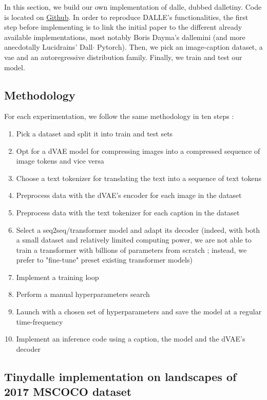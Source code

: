 \documentclass{article}
\begin{document}
\begin{multicols}{2}

In this section, we build our own implementation of \gls{dalle}, dubbed \gls{dalletiny}. Code is located on \href{https://github.com/cthiounn/dalle-tiny}{Github}. In order to reproduce DALLE's functionalities, the first step before implementing is to link the initial paper to the different already available implementations, most notably Boris Dayma's \gls{dallemini} (and more anecdotally Lucidrains' Dall$\cdot$ Pytorch). Then, we pick an image-caption dataset, a \gls{vae} and an autoregressive distribution family. Finally, we train and test our model.

\subsection{Methodology}

For each experimentation, we follow the same methodology in ten steps :

\begin{enumerate}
\item Pick a dataset and split it into train and test sets
    \item Opt for a dVAE model for compressing images into a compressed sequence of image tokens and vice versa
    \item Choose a text tokenizer for translating the text into a sequence of text tokens
    \item Preprocess data with the dVAE's encoder for each image in the dataset
    \item Preprocess data with the text tokenizer for each caption in the dataset
    \item Select a seq2seq/transformer model and adapt its decoder (indeed, with both a small dataset and relatively limited computing power, we are not able to train a transformer with billions of parameters from scratch ; instead, we prefer to "fine-tune" preset existing transformer models)
    \item Implement a training loop
    \item Perform a manual hyperparameters search
    \item Launch with a chosen set of hyperparameters and save the model at a regular time-frequency
    \item Implement an inference code using a caption, the model and the dVAE's decoder
\end{enumerate}

\subsection{Tinydalle implementation on landscapes of 2017 MSCOCO dataset}


\end{multicols}
\end{document}
